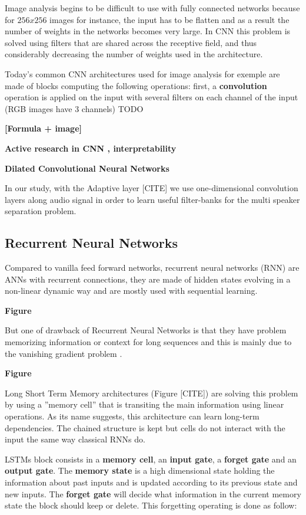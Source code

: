 \documentclass[master,final,11pt]{iscs-thesis}
\begin{document}
Image analysis begins to be difficult to use with fully connected networks because for $256x256$ images for instance, the input has to be flatten and as a result the number of weights in the networks becomes very large. In CNN this problem is solved using filters that are shared across the receptive field, and thus considerably decreasing the number of weights used in the architecture.

Today's common CNN architectures used for image analysis for exemple are made of blocks computing the following operations: first, a \textbf{convolution} operation is applied on the input with several filters on each channel of the input (RGB images have 3 channels) TODO

\textbf{[Formula + image]
}

\textbf{Active research in CNN , interpretability 
}

\textbf{Dilated Convolutional Neural Networks
}

In our study, with the Adaptive layer [CITE] we use one-dimensional convolution layers along audio signal in order to learn useful filter-banks for the multi speaker separation problem.

\subsection{Recurrent Neural Networks}

Compared to vanilla feed forward networks, recurrent neural networks (RNN) are ANNs with recurrent connections, they are made of hidden states evolving in a non-linear dynamic way and
are mostly used with sequential learning.

\textbf{Figure}

But one of drawback of Recurrent Neural Networks is that they have problem memorizing information or context for long sequences and this is mainly due to the vanishing gradient problem \cite{RNNexploding}.

\textbf{Figure}


Long Short Term Memory architectures \cite{LSTM} (Figure [CITE]) are solving this problem by using a ''memory cell'' that is transiting the main information using linear operations. As its name suggests, this architecture can learn long-term dependencies.
The chained structure is kept but cells do not interact with the input the same way classical RNNs do. 


LSTMs block consists in a \textbf{memory cell}, an \textbf{input gate}, a \textbf{forget gate} and an \textbf{output gate}.
The \textbf{memory state} is a high dimensional state holding the information about past inputs and is updated according to its previous state and new inputs.
The \textbf{forget gate} will decide what information in the current memory state the block should keep or delete. This forgetting operating is done as follow:
\end{document}
